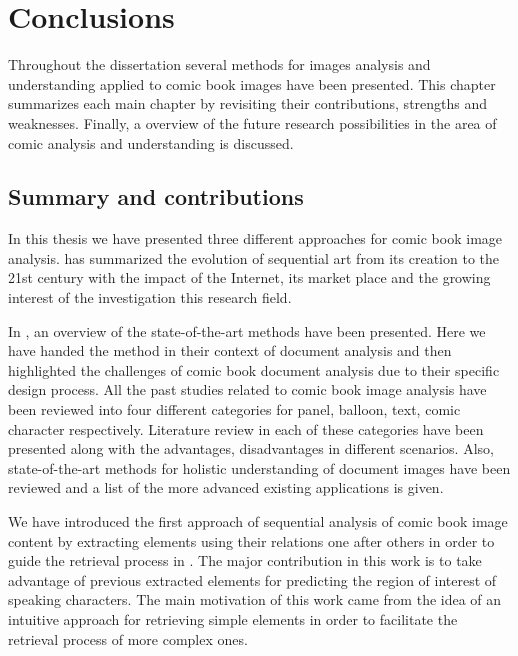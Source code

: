 \chapter{Conclusions} %
\label{chap:conclusions}

Throughout the dissertation several methods for images analysis and understanding applied to comic book images have been presented.
This chapter summarizes each main chapter by revisiting their contributions, strengths and weaknesses.
Finally, a overview of the future research possibilities in the area of comic analysis and understanding is discussed.

\section{Summary and contributions}
\label{conclusions:summary}


In this thesis we have presented three different approaches for comic book image analysis.  has summarized the evolution of sequential art from its creation to the 21st century with the impact of the Internet, its market place and the growing interest of the investigation this research field.

In , an overview of the state-of-the-art methods have been presented. Here we have handed the method in their context of document analysis and then highlighted the challenges of comic book document analysis due to their specific design process.
All the past studies related to comic book image analysis have been reviewed into four different categories for panel, balloon, text, comic character respectively.
Literature review in each of these categories have been presented along with the advantages, disadvantages in different scenarios.
Also, state-of-the-art methods for holistic understanding of document images have been reviewed and a list of the more advanced existing applications is given.

We have introduced the first approach of sequential analysis of comic book image content by extracting elements using their relations one after others in order to guide the retrieval process in .
The major contribution in this work is to take advantage of previous extracted elements for predicting the region of interest of speaking characters.
The main motivation of this work came from the idea of an intuitive approach for retrieving simple elements in order to facilitate the retrieval process of more complex ones.


